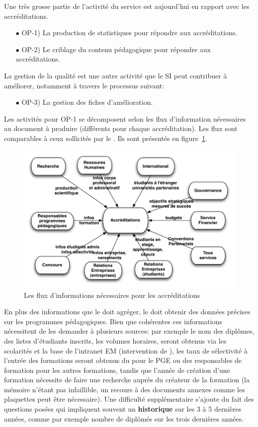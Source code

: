 \documentclass{book}
\begin{document}
Une très grosse partie de l'activité du service est aujourd'hui en rapport 
avec les accréditations. 
\begin{itemize}
\item[$\bullet$] OP-1) La production de statistiques pour répondre aux 
			     accréditations.
\item[$\bullet$] OP-2) Le criblage du contenu pédagogique pour répondre 
			     aux accréditations.
\end{itemize}
La gestion de la qualité est une autre activité que le SI peut contribuer à
améliorer, notamment à travers le processus suivant:
\begin{itemize}
\item[$\bullet$] OP-3) La gestion des fiches d'amélioration.
\end{itemize}
\bigskip
Les activités pour OP-1 se décomposent selon les flux d'information 
nécessaires au document à produire (différents pour chaque accréditation). 
Les flux sont comparables à ceux sollicités par le \scom. Ils sont présentés 
en figure~\ref{fg:accred_flux}.
\begin{figure}[hbt]
\begin{center}
\includegraphics[width=.75\linewidth]{figs/accred_flux.pdf}
\end{center}
\caption{Les flux d'informations nécessaires pour les accréditations}
\label{fg:accred_flux}
\end{figure}
En plus des informations que le \scom doit agréger, le \sop doit obtenir des 
données précises sur les programmes pédagogiques. Bien que cohérentes ces 
informations nécessitent de les demander à plusieurs sources: par exemple
le nom des diplômes, des listes d'étudiants inscrits, les volumes horaires,
seront obtenus via les scolarités et la base de l'intranet EM (intervention de 
\CK), les taux de sélectivité à l'entrée des formations seront obtenus du \sconc 
pour le PGE ou des responsables de formation pour les autres formations, 
tandis que l'année de création d'une formation nécessite
de faire une recherche auprès du créateur de la formation (la mémoire n'étant
pas infaillible, un recours à des documents annexes comme les plaquettes peut
être nécessaire).
Une difficulté supplémentaire s'ajoute du fait des questions posées qui 
impliquent souvent un \textbf{historique} sur les 3 à 5 dernières années, comme 
par exemple nombre de diplômés sur les trois dernières années.
\end{document}
